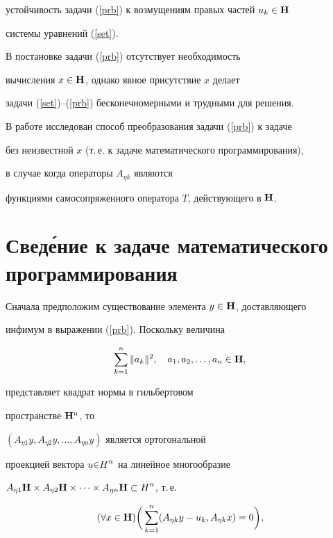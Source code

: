 устойчивость задачи (\ref{prb}) к возмущениям правых частей $u_k\in {\bold H}$


системы уравнений (\ref{set}).


В постановке задачи (\ref{prb}) отсутствует необходимость


вычисления $x\in {\bold H}$, однако явное присутствие $x$ делает


задачи (\ref{set})--(\ref{prb}) бесконечномерными и трудными для решения.


В работе исследован способ преобразования задачи (\ref{prb}) к задаче


без неизвестной $x$ (т.\,е. к задаче математического программирования),


в случае когда операторы $A_{\eta k}$ являются


функциями самосопряженного оператора $T$, действующего в ${\bold H}$.





\section*{Свед\'ение к задаче математического программирования}





Сначала предположим существование элемента $y\in {\bold H}$, доставляющего


инфимум в выражении (\ref{prb}). Поскольку величина


$$


\sum_{k=1}^n\| a_k\|^2,\quad a_1,a_2,\dotsc,a_n\in {\bold H},


$$


представляет квадрат нормы в гильбертовом 


пространстве ${\bold H}^n$, то


$(A_{\eta 1}y,A_{\eta 2}y, \dotsc,A_{\eta n}y)$ является ортогональной


проекцией вектора $u{\bold \in H}^n$ на линейное многообразие


$A_{\eta 1}{\bold H}\times A_{\eta 2}{\bold H}\times \dotsb \times


A_{\eta n}{\bold H\subset H}^n$, т.\,е. 


$$


(\forall x\in {\bold H}) \bigg( \sum_{k=1}^n( A_{\eta


k}y-u_k,A_{\eta k}x) =0\bigg), 


$$


